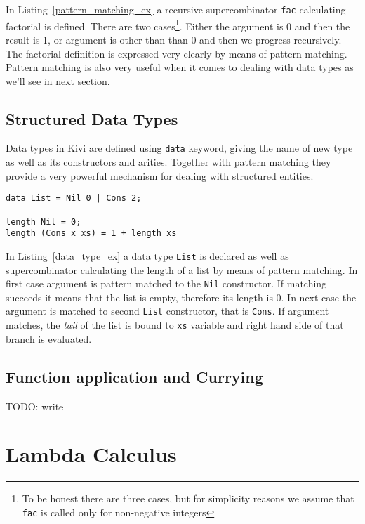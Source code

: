 \documentclass[a4paper]{report}
\begin{document}
In Listing~\ref{pattern_matching_ex} a recursive supercombinator \texttt{fac}
calculating factorial is defined. There are two cases\footnote{To be honest
there are three cases, but for simplicity reasons we assume that
\texttt{fac} is called only for non-negative integers}. Either the
argument is 0 and then the result is 1, or argument is other than than 0 and
then we progress recursively. The factorial definition is expressed very
clearly by means of pattern matching.
Pattern matching is also very useful when it comes to dealing with data
types as we'll see in next section.

\subsection{Structured Data Types}
Data types in Kivi are defined using \texttt{data} keyword, giving the name of
new type as well as its constructors and arities. Together with pattern matching they
provide a very powerful mechanism for dealing with structured entities.

\begin{lstlisting}[label=data_type_ex,caption={Calculating length of list.}]
data List = Nil 0 | Cons 2;

length Nil = 0;
length (Cons x xs) = 1 + length xs
\end{lstlisting}

In Listing~\ref{data_type_ex} a data type \texttt{List} is declared as well as
supercombinator calculating the length of a list by means of pattern matching.
In first case argument is pattern matched to the \texttt{Nil} constructor. If
matching succeeds it means that the list is empty, therefore its length is 0.
In next case the argument is matched to second \texttt{List} constructor, that
is \texttt{Cons}. If argument matches, the \textit{tail} of the list is bound to
\texttt{xs} variable and right hand side of that branch is evaluated.

\subsection{Function application and Currying}

TODO: write

\section{Lambda Calculus}
\end{document}
